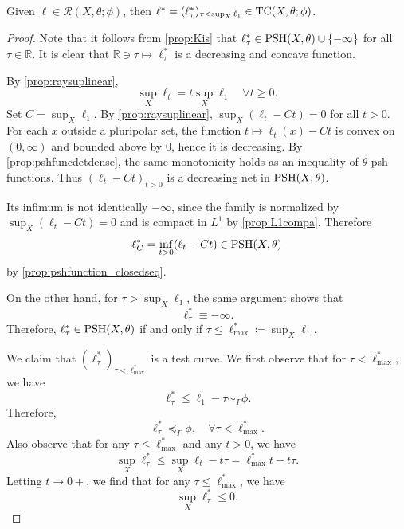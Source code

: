 \begin{lemma}\label{lma:LegendsRtoTC}
    Given $\ell\in \mathcal{R}(X,\theta;\phi)$, then $\ell^*=(\ell^*_\tau)_{\tau<\sup_X \ell_1}\in \mathrm{TC}(X,\theta;\phi)$.
\end{lemma}
\begin{proof}
    Note that it follows from \cref{prop:Kis} that $\ell^*_{\tau}\in \mathrm{PSH}(X,\theta)\cup \{-\infty\}$ for all $\tau\in \mathbb{R}$. It is clear that $\mathbb{R}\ni \tau\mapsto \ell^*_{\tau}$ is a decreasing and concave function.

    By \cref{prop:raysuplinear},
    \[
    \sup_X\ell_t= t\sup_X \ell_1 \quad \forall t\geq 0.
    \]
    Set $C=\sup_X\ell_1$. By \cref{prop:raysuplinear}, $\sup_X(\ell_t-Ct)=0$ for all $t>0$. For each $x$ outside a pluripolar set, the function $t\mapsto \ell_t(x)-Ct$ is convex on $(0,\infty)$ and bounded above by $0$, hence it is decreasing. By \cref{prop:pshfuncdetdense}, the same monotonicity holds as an inequality of $\theta$-psh functions. Thus $(\ell_t-Ct)_{t>0}$ is a decreasing net in $\mathrm{PSH}(X,\theta)$.

    Its infimum is not identically $-\infty$, since the family is normalized by $\sup_X(\ell_t-Ct)=0$ and is compact in $L^1$ by \cref{prop:L1compa}. Therefore
    \[
        \ell^*_{C}=\inf_{t>0}(\ell_t-Ct)\in \mathrm{PSH}(X,\theta)
    \]
    by \cref{prop:pshfunction_closedseq}.

    On the other hand, for $\tau>\sup_X \ell_1$, the same argument shows that
    \[
    \ell^*_{\tau}\equiv -\infty.
    \]
    Therefore, $\ell^*_{\tau}\in \mathrm{PSH}(X,\theta)$ if and only if $\tau\leq \ell^*_{\max}\coloneqq \sup_X \ell_1$.

    We claim that $(\ell^*_{\tau})_{\tau<\ell^*_{\max}}$ is a test curve. We first observe that for $\tau<\ell^*_{\max}$, we have
    \[
    \ell^*_{\tau}\leq \ell_1-\tau\sim_P \phi.
    \]
    Therefore,
    \begin{equation}\label{eq:elltaupreceqpphi}
        \ell^*_{\tau}\preceq_P \phi,\quad \forall \tau<\ell^*_{\max}.
    \end{equation}
    Also observe that for any $\tau\leq \ell^*_{\max}$ and any $t>0$, we have
    \[
    \sup_X \ell^*_{\tau}\leq \sup_X \ell_t-t\tau=\ell^*_{\max}t-t\tau.
    \]
    Letting $t\to 0+$, we find that for any $\tau\leq \ell^*_{\max}$, we have
    \begin{equation}\label{eq:supXelltaustarnegtemp1}
    \sup_X \ell^*_{\tau}\leq 0.
    \end{equation}


\end{proof}
